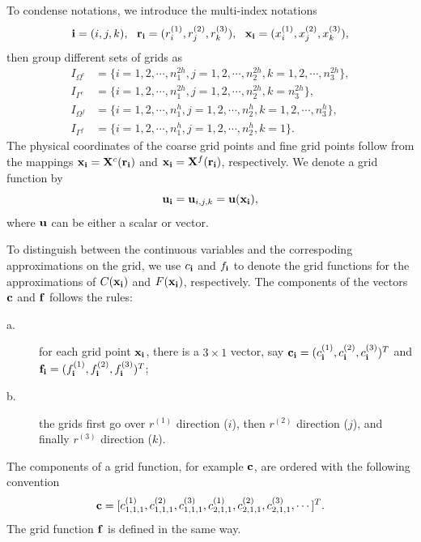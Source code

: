  To condense notations, we introduce the multi-index notations
\[{\bf i} = (i,j,k),\ \ {\bf r}_{\bf i} = (r^{(1)}_i,r^{(2)}_j,r^{(3)}_k),\ \ {\bf x}_{\bf i} = (x^{(1)}_i,x^{(2)}_j,x^{(3)}_k),\]
then group different sets of grids as
\begin{equation*}
\begin{aligned}
	I_{\Omega^c} &= \{i = 1,2,\cdots,n_1^{2h}, j = 1,2,\cdots,n_2^{2h}, k = 1,2,\cdots,n_3^{2h}\},\\
	I_{\Gamma^c} & = \{i = 1,2,\cdots,n_1^{2h}, j = 1,2,\cdots,n_2^{2h}, k = n_3^{2h}\},\\
	I_{\Omega^f} &= \{i = 1,2,\cdots,n_1^h, j = 1,2,\cdots,n_2^h, k = 1,2,\cdots,n_3^h\},\\
	I_{\Gamma^f} & = \{i = 1,2,\cdots,n_1^{h}, j = 1,2,\cdots,n_2^{h}, k = 1\}.
\end{aligned}	
\end{equation*}
The physical coordinates of the coarse grid points and fine grid points follow from the mappings ${\bf x}_{\bf i} = {\bf X}^c({\bf r}_{\bf i})$ and ${\bf x}_{\bf i} = {\bf X}^f({\bf r}_{\bf i})$, respectively. We denote a grid function by
\[{\bf u}_{\bf i} = {\bf u}_{i,j,k} = {\bf u}({\bf x}_{\bf i}),\]
where ${\bf u}$ can be either a scalar or vector. {\color{red} To distinguish between the continuous variables and the correspoding approximations on the grid, we use $c_{\bf i}$ and $f_{\bf i}$ to denote the grid functions for the approximations of $C({\bf x}_{\bf i})$ and $F({\bf x}_{\bf i})$, respectively. The components of the vectors $\bf c$ and $\bf f$ follows the rules:
	\begin{description}
		\item[a.] for each grid point ${\bf x}_{\bf i}$, there is a $3\times 1$ vector, say ${\bf c}_{\bf i} = (c^{(1)}_{\bf i}, c^{(2)}_{\bf i}, c^{(3)}_{\bf i})^T$ and ${\bf f}_{\bf i} = (f^{(1)}_{\bf i}, f^{(2)}_{\bf i}, f^{(3)}_{\bf i})^T$;
		\item[b.] the grids first go over $r^{(1)}$ direction ($i$), then $r^{(2)}$ direction ($j$), and finally $r^{(3)}$ direction ($k$).
	\end{description}
}
The components of a grid function, for example $\bf c$, are ordered with the following convention
\[
{\bf c} = [c^{(1)}_{1,1,1}, c^{(2)}_{1,1,1}, c^{(3)}_{1,1,1},c^{(1)}_{2,1,1}, c^{(2)}_{2,1,1}, c^{(3)}_{2,1,1},\cdots]^T.
\]
The grid function $\bf f$ is defined in the same way. 
	
	

